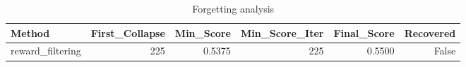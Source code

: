 \begin{table}[htbp]
\centering
\caption{Forgetting analysis}
\label{tab:forgetting}
\begin{tabular}{lrrrrr}
\toprule
\textbf{Method} & \textbf{First\_Collapse} & \textbf{Min\_Score} & \textbf{Min\_Score\_Iter} & \textbf{Final\_Score} & \textbf{Recovered} \\
\midrule
reward\_filtering & 225 & 0.5375 & 225 & 0.5500 & False \\
\bottomrule
\end{tabular}
\end{table}